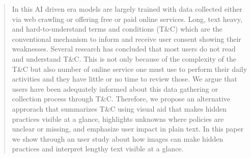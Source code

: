 \documentclass[manuscript,review,anonymous]{acmart}
\begin{document}
\begin{abstract}

  In this AI driven era models are largely trained with data collected either via web crawling or offering free or paid online services. Long, text heavy, and hard-to-understand terms and conditions (T\&C) which are the conventional mechanism to inform and receive user consent showing their weaknesses. Several research has concluded that most users do not read and understand T\&C. This is not only because of the complexity of the T\&C but also number of online service one must use to perform their daily activities and they have little or no time to review those. We argue that users have been adequately informed about this data gathering or collection process through T\&C. Therefore, we propose an alternative approrach that summarizes T\&C using visual aid that makes hidden practices visible at a glance, highlights unknowns where policies are unclear or missing, and emphasize user impact in plain text. In this paper we show through an user study about how images can make hidden practices and interpret lengthy text visible at a glance.



%
%
%
%


\end{abstract}
\end{document}
